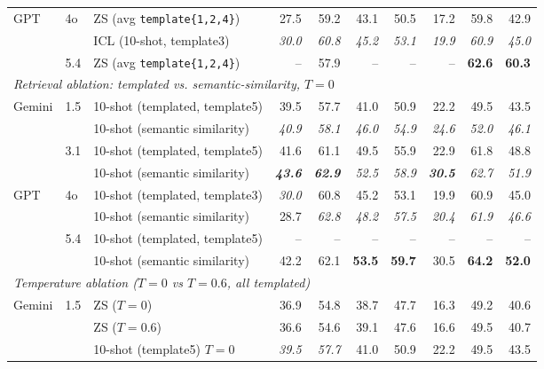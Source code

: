 \begin{table}[t]
\begin{tabular}{lllrrrrrrr}
\cmidrule(lr){1-10}
\multirow{3}{*}{GPT} & \multirow{2}{*}{4o} & ZS (avg \texttt{template\{1,2,4\}}) & 27.5 & 59.2 & 43.1 & 50.5 & 17.2 & 59.8 & 42.9 \\
 &  & ICL (10-shot, template3) & \emph{30.0} & \emph{60.8} & \emph{45.2} & \emph{53.1} & \emph{19.9} & \emph{60.9} & \emph{45.0} \\
\cmidrule(lr){2-10}
 & \multirow{1}{*}{5.4} & ZS (avg \texttt{template\{1,2,4\}}) & -- & 57.9 & -- & -- & -- & \textbf{62.6} & \textbf{60.3} \\
\midrule\midrule
\multicolumn{10}{l}{\textit{Retrieval ablation: templated vs. semantic-similarity, $T{=}0$}} \\
\midrule
\multirow{4}{*}{Gemini} & \multirow{2}{*}{1.5} & 10-shot (templated, template5) & 39.5 & 57.7 & 41.0 & 50.9 & 22.2 & 49.5 & 43.5 \\
 &  & 10-shot (semantic similarity) & \emph{40.9} & \emph{58.1} & \emph{46.0} & \emph{54.9} & \emph{24.6} & \emph{52.0} & \emph{46.1} \\
\cmidrule(lr){2-10}
 & \multirow{2}{*}{3.1} & 10-shot (templated, template5) & 41.6 & 61.1 & 49.5 & 55.9 & 22.9 & 61.8 & 48.8 \\
 &  & 10-shot (semantic similarity) & \textbf{\emph{43.6}} & \textbf{\emph{62.9}} & \emph{52.5} & \emph{58.9} & \textbf{\emph{30.5}} & \emph{62.7} & \emph{51.9} \\
\cmidrule(lr){1-10}
\multirow{4}{*}{GPT} & \multirow{2}{*}{4o} & 10-shot (templated, template3) & \emph{30.0} & 60.8 & 45.2 & 53.1 & 19.9 & 60.9 & 45.0 \\
 &  & 10-shot (semantic similarity) & 28.7 & \emph{62.8} & \emph{48.2} & \emph{57.5} & \emph{20.4} & \emph{61.9} & \emph{46.6} \\
\cmidrule(lr){2-10}
 & \multirow{2}{*}{5.4} & 10-shot (templated, template5) & -- & -- & -- & -- & -- & -- & -- \\
 &  & 10-shot (semantic similarity) & 42.2 & 62.1 & \textbf{53.5} & \textbf{59.7} & 30.5 & \textbf{64.2} & \textbf{52.0} \\
\midrule\midrule
\multicolumn{10}{l}{\textit{Temperature ablation ($T{=}0$ vs $T{=}0.6$, all templated)}} \\
\midrule
\multirow{8}{*}{Gemini} & \multirow{4}{*}{1.5} & ZS ($T{=}0$) & 36.9 & 54.8 & 38.7 & 47.7 & 16.3 & 49.2 & 40.6 \\
 &  & ZS ($T{=}0.6$) & 36.6 & 54.6 & 39.1 & 47.6 & 16.6 & 49.5 & 40.7 \\
 &  & 10-shot (template5) $T{=}0$ & \emph{39.5} & \emph{57.7} & 41.0 & 50.9 & 22.2 & 49.5 & 43.5 \\

\end{tabular}
\end{table}

